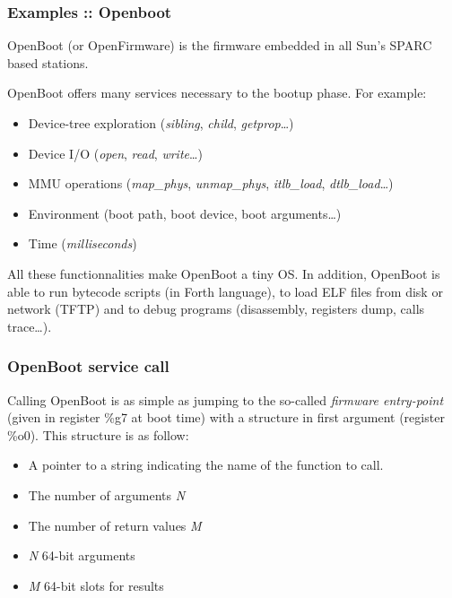 \begin{frame}
  \frametitle{Examples :: Openboot}

  OpenBoot (or OpenFirmware) is the firmware embedded in all Sun's
  SPARC based stations.

  \-

  OpenBoot offers many services necessary to the
  bootup phase. For example:

  \begin{itemize}
  \item
    Device-tree exploration (\emph{sibling}, \emph{child},
    \emph{getprop}\ldots)
  \item
    Device I/O (\emph{open}, \emph{read}, \emph{write}\ldots)
  \item
    MMU operations (\emph{map\_phys}, \emph{unmap\_phys}, \emph{itlb\_load},
    \emph{dtlb\_load}\ldots)
  \item
    Environment (boot path, boot device, boot arguments\ldots)
  \item
    Time (\emph{milliseconds})
  \end{itemize}

  \-

  All these functionnalities make OpenBoot a tiny OS. In addition,
  OpenBoot is able to run bytecode scripts (in Forth language), to
  load ELF files from disk or network (TFTP) and to debug programs
  (disassembly, registers dump, calls trace\ldots).

\end{frame}

\begin{frame}
  \frametitle{OpenBoot service call}

  Calling OpenBoot is as simple as jumping to the so-called
  \emph{firmware entry-point} (given in register \%g7 at boot time)
  with a structure in first argument (register \%o0). This structure is
  as follow:

  \begin{itemize}
  \item
    A pointer to a string indicating the name of the function to call.
  \item
    The number of arguments \emph{N}
  \item
    The number of return values \emph{M}
  \item
    \emph{N} 64-bit arguments
  \item
    \emph{M} 64-bit slots for results
  \end{itemize}

\end{frame}

